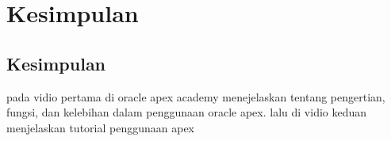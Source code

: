 \chapter{Kesimpulan}
\section{Kesimpulan}
pada vidio pertama di oracle apex academy menejelaskan tentang pengertian, fungsi, dan kelebihan dalam penggunaan oracle apex. lalu di vidio keduan menjelaskan tutorial penggunaan apex